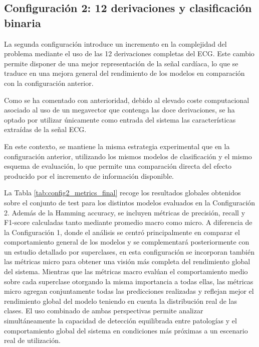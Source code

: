 \documentclass[12pt,a4paper,twoside]{book}
\begin{document}
\subsection{Configuración 2: 12 derivaciones y clasificación binaria}

La segunda configuración introduce un incremento en la complejidad del problema mediante el uso de las 12 derivaciones completas del ECG. 
Este cambio permite disponer de una mejor representación de la señal cardíaca, lo que se traduce en una mejora general del rendimiento de los modelos en comparación con la configuración anterior.

Como se ha comentado con anterioridad, debido al elevado coste computacional asociado al uso de un megavector que contenga las doce derivaciones, se ha optado por utilizar únicamente como entrada del sistema las características extraídas de la señal ECG. 

En este contexto, se mantiene la misma estrategia experimental que en la configuración anterior, utilizando los mismos modelos de clasificación y el mismo esquema de evaluación, lo que permite una comparación directa del efecto producido por el incremento de información disponible.

La Tabla \ref{tab:config2_metrics_final} recoge los resultados globales obtenidos sobre el conjunto de test para los distintos modelos evaluados en la Configuración 2. 
Además de la Hamming accuracy, se incluyen métricas de precisión, recall y F1-score calculadas tanto mediante promedio macro como micro. 
A diferencia de la Configuración 1, donde el análisis se centró principalmente en comparar el comportamiento general de los modelos y se complementará posteriormente con un estudio detallado por superclases, en esta configuración se incorporan también las métricas micro para obtener una visión más completa del rendimiento global del sistema. 
Mientras que las métricas macro evalúan el comportamiento medio sobre cada superclase otorgando la misma importancia a todas ellas, las métricas micro agregan conjuntamente todas las predicciones realizadas y reflejan mejor el rendimiento global del modelo teniendo en cuenta la distribución real de las clases. 
El uso combinado de ambas perspectivas permite analizar simultáneamente la capacidad de detección equilibrada entre patologías y el comportamiento global del sistema en condiciones más próximas a un escenario real de utilización.
\end{document}
